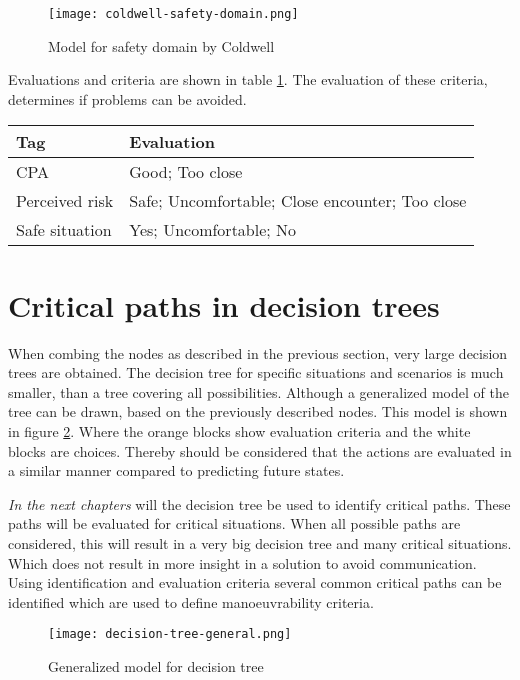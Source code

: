 \begin{figure}[p]
	\centering
	\texttt{[image: coldwell-safety-domain.png]}
	\caption{Model for safety domain by Coldwell}
	\label{fig:coldwell-safety-domain}
\end{figure}

Evaluations and criteria are shown in table \ref{tab:criteria-safe-situation}. The evaluation of these criteria, determines if problems can be avoided.

\begin{table}[H]
	\begin{tabular}{p{}|p{}}
		\toprule
		Tag & Evaluation\\
		\midrule
		CPA & Good; Too close\\
		Perceived risk & Safe; Uncomfortable; Close encounter; Too close\\
		Safe situation & Yes; Uncomfortable; No\\
		\bottomrule
	\end{tabular}
	
	\label{tab:criteria-safe-situation}
\end{table}


\section{Critical paths in decision trees}
When combing the nodes as described in the previous section, very large decision trees are obtained. The decision tree for specific situations and scenarios is much smaller, than a tree covering all possibilities. Although a generalized model of the tree can be drawn, based on the previously described nodes. This model is shown in figure \ref{fig:decision-tree-general}. Where the orange blocks show evaluation criteria and the white blocks are choices. Thereby should be considered that the actions are evaluated in a similar manner compared to predicting future states.

\emph{In the next chapters} will the decision tree be used to identify critical paths. These paths will be evaluated for critical situations. When all possible paths are considered, this will result in a very big decision tree and many critical situations. Which does not result in more insight in a solution to avoid communication. Using identification and evaluation criteria several common critical paths can be identified which are used to define manoeuvrability criteria.

\begin{figure}[p]
	\centering
	\texttt{[image: decision-tree-general.png]}
	\caption{Generalized model for decision tree}
	\label{fig:decision-tree-general}
\end{figure}

